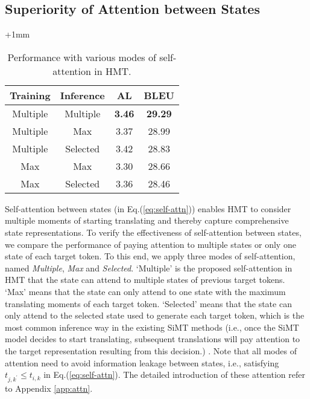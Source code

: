 \documentclass{article} %
\begin{document}
\subsection{Superiority of Attention between States}
\label{sec:self-attn}

\setlength{\columnsep}{12pt}
\begin{wraptable}{r}{5.7cm}
\vspace{-3.5mm}
\caption{Performance with various modes of self-attention in HMT.}
\label{table:attn}
\vspace{-0.05in} 
\advance\leftskip+1mm
\small
\centering
\begin{tabular}{cc|cc} \hline
\textbf{Training} & \textbf{Inference} & \textbf{AL}   & \textbf{BLEU}  \\\hline
Multiple      & Multiple       & \textbf{3.46} & \textbf{29.29} \\
Multiple      & Max       & 3.37 & 28.99 \\
Multiple      & Selected  & 3.42 & 28.83 \\\hline
Max      & Max       & 3.30 & 28.66 \\
Max      & Selected  & 3.36 & 28.46 \\ \hline
\end{tabular}
\vspace{-0.2in} 
\end{wraptable}
Self-attention between states (in Eq.(\ref{eq:self-attn})) enables HMT to consider multiple moments of starting translating and thereby capture comprehensive state representations. To verify the effectiveness of self-attention between states, we compare the performance of paying attention to multiple states or only one state of each target token. To this end, we apply three modes of self-attention, named \emph{Multiple}, \emph{Max} and \emph{Selected}. `Multiple' is the proposed self-attention in HMT that the state can attend to multiple states of previous target tokens. `Max' means that the state can only attend to one state with the maximum translating moments of each target token. `Selected' means that the state can only attend to the selected state used to generate each target token, which is the most common inference way in the existing SiMT methods (i.e., once the SiMT model decides to start translating, subsequent translations will pay attention to the target representation resulting from this decision.) \citep{ma-etal-2019-stacl,Ma2019a}. Note that all modes of attention need to avoid information leakage between states, i.e., satisfying $ t_{j,k^{'}}\leq t_{i,k}$ in Eq.(\ref{eq:self-attn}). The detailed introduction of these attention refer to Appendix \ref{app:attn}.
\end{document}
